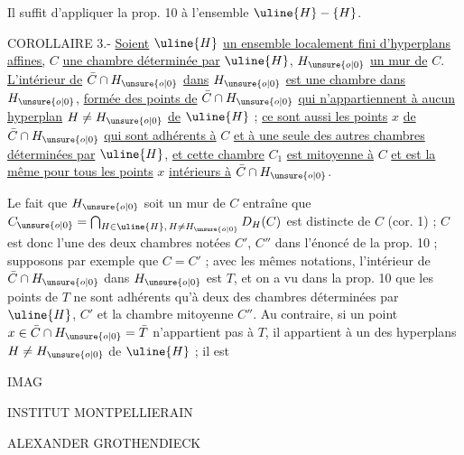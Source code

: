 Il suffit d'appliquer la prop. 10 à l'ensemble $\uline{H}-\{H\}$.

COROLLAIRE 3.- \uline{Soient} $\uline{H}$ \uline{un ensemble localement fini d'hyperplans affines,} $C$ \uline{une chambre déterminée par} $\uline{H}$, $H_{\unsure{o|0}}$ \uline{un mur de} $C$. \uline{L'intérieur de} $\bar C\cap H_{\unsure{o|0}}$ \uline{dans} $H_{\unsure{o|0}}$ \uline{est une chambre dans} $H_{\unsure{o|0}}$, \uline{formée des points de} $\bar C\cap H_{\unsure{o|0}}$ \uline{qui n'appartiennent à aucun hyperplan} $H\neq H_{\unsure{o|0}}$ \uline{de} $\uline{H}$ ; \uline{ce sont aussi les points} $x$ \uline{de} $\bar C\cap H_{\unsure{o|0}}$ \uline{qui sont adhérents à} $C$ \uline{et à une seule des autres chambres déterminées par} $\uline{H}$, \uline{et cette chambre} $C_1$ \uline{est mitoyenne à} $C$ \uline{et est la même pour tous les points} $x$ \uline{intérieurs à} $\bar C\cap H_{\unsure{o|0}}$.

Le fait que $H_{\unsure{o|0}}$ soit un mur de $C$ entraîne que $C_{\unsure{o|0}}=\bigcap_{H\in\uline{H},\,H\neq H_{\unsure{o|0}}}D_H(C)$ est distincte de $C$ (cor. 1) ; $C$ est donc l'une des deux chambres notées $C'$, $C''$ dans l'énoncé de la prop. 10 ; supposons par exemple que $C=C'$ ; avec les mêmes notations, l'intérieur de $\bar C\cap H_{\unsure{o|0}}$ dans $H_{\unsure{o|0}}$ est $T$, et on a vu dans la prop. 10 que les points de $T$ ne sont adhérents qu'à deux des chambres déterminées par $\uline{H}$, $C'$ et la chambre mitoyenne $C''$. Au contraire, si un point $x\in\bar C\cap H_{\unsure{o|0}}=\bar T$ n'appartient pas à $T$, il appartient à un des hyperplans $H\neq H_{\unsure{o|0}}$ de $\uline{H}$ ; il est


IMAG

INSTITUT MONTPELLIERAIN

ALEXANDER GROTHENDIECK


